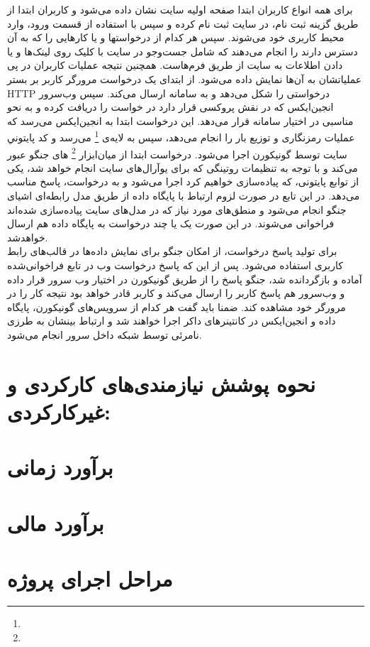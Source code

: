 \documentclass{article}
\begin{document}
برای همه انواع کاربران ابتدا صفحه اولیه سایت نشان داده‌ می‌شود و کاربران ابتدا از طریق گزینه ثبت نام، در سایت ثبت نام کرده و سپس با استفاده از قسمت ورود، وارد محیط کاربری خود می‌شوند. سپس  هر کدام از درخواستها و یا کارهایی را که به آن دسترس دارند را انجام می‌دهند که شامل جست‌و‌جو در سایت با کلیک روی لینک‌ها و یا دادن اطلاعات به سایت از طریق فرم‌هاست. همچنین نتیجه عملیات کاربران در پی عملیاتشان به آن‌ها نمایش داده‌ می‌شود. از ابتدای یک درخواست مرورگر کاربر بر بستر HTTP درخواستی را شکل می‌دهد و به سامانه ارسال می‌کند. سپس وب‌سرور انجین‌ایکس که در نقش پروکسی قرار دارد در خواست را دریافت کرده و به نحو مناسبی در اختیار سامانه  قرار می‌دهد. این درخواست ابتدا به انجین‌ایکس می‌رسد که عملیات رمزنگاری و توزیع بار را انجام می‌دهد، سپس به لایه‌ی \footnote{} می‌رسد و کد پایتونیِ سایت توسط گونیکورن اجرا می‌شود. درخواست ابتدا از میان‌ابزار \footnote{} های جنگو عبور می‌کند و با توجه به تنظیمات روتینگی که برای یو‌آرال‌های سایت انجام خواهد شد، یکی از توابع پایتونی‌، که پیاده‌سازی خواهیم کرد اجرا می‌شود و به درخواست، پاسخ مناسب می‌دهد. در این تابع در صورت لزوم ارتباط با پایگاه داده از طریق مدل‌ رابطه‌ای اشیای جنگو انجام می‌شود و منطق‌های مورد نیاز که در مدل‌های سایت پیاده‌سازی شده‌اند فراخوانی می‌شوند. در این صورت یک یا چند درخواست به پایگاه داده ‌هم ارسال خواهدشد. \\
برای تولید پاسخ درخواست، از امکان جنگو برای نمایش داده‌ها در قالب‌های رابط کاربری استفاده می‌شود. پس از این که پاسخ درخواست وب در تابع فراخوانی‌شده آماده و بازگردانده شد، جنگو پاسخ را از طریق گونیکورن در اختیار وب سرور قرار داده و وب‌سرور هم پاسخ کاربر را ارسال می‌کند و کاربر قادر خواهد بود نتیجه کار را در مرورگر خود مشاهده کند. ضمنا باید گفت هر کدام از سرویس‌های گونیکورن، پایگاه داده و انجین‌ایکس در کانتینرهای داکر اجرا‌ خواهند شد و ارتباط بینشان به طرزی نامرئی توسط شبکه داخل سرور انجام می‌شود.

\section{نحوه پوشش نیازمندی‌های کارکردی و غیرکارکردی:}
\section{برآورد زمانی}
\section{برآورد مالی}
\section{مراحل اجرای پروژه}
\end{document}
